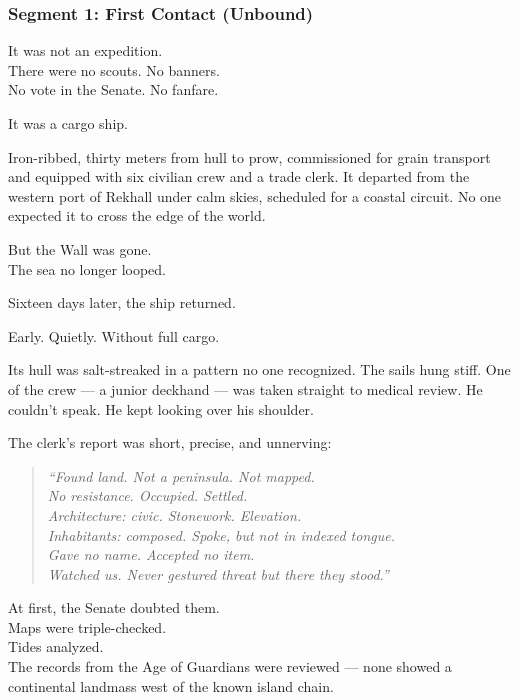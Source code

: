 \documentclass[9pt]{article}
\begin{document}
\newpage

\subsubsection*{Segment 1: First Contact (Unbound)}

It was not an expedition.\\
There were no scouts. No banners.\\
No vote in the Senate. No fanfare.

It was a cargo ship.

Iron-ribbed, thirty meters from hull to prow, commissioned for grain transport and equipped with six civilian crew and a trade clerk. It departed from the western port of Rekhall under calm skies, scheduled for a coastal circuit. No one expected it to cross the edge of the world.

But the Wall was gone.\\
The sea no longer looped.

\vspace{1em}

Sixteen days later, the ship returned.

Early. Quietly. Without full cargo.

Its hull was salt-streaked in a pattern no one recognized. The sails hung stiff. One of the crew --- a junior deckhand --- was taken straight to medical review. He couldn’t speak. He kept looking over his shoulder.

The clerk’s report was short, precise, and unnerving:

\begin{quote}
\textit{“Found land. Not a peninsula. Not mapped.}\\
\textit{No resistance. Occupied. Settled.}\\
\textit{Architecture: civic. Stonework. Elevation.}\\
\textit{Inhabitants: composed. Spoke, but not in indexed tongue.}\\
\textit{Gave no name. Accepted no item.}\\
\textit{Watched us. Never gestured threat but there they stood.”}
\end{quote}

\vspace{1em}

At first, the Senate doubted them.\\
Maps were triple-checked.\\
Tides analyzed.\\
The records from the Age of Guardians were reviewed --- none showed a continental landmass west of the known island chain.
\end{document}
